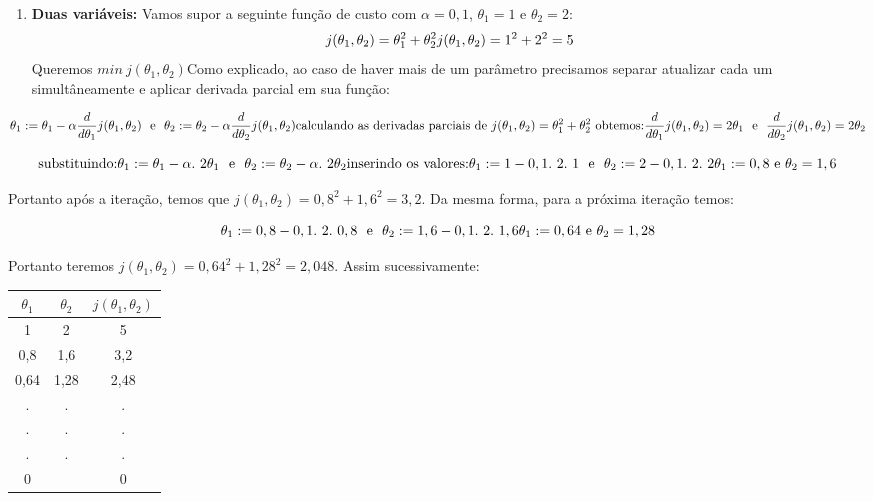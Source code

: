 \documentclass[
]{book}
\providecommand{\tightlist}{%
  \setlength{\itemsep}{0pt}\setlength{\parskip}{0pt}}
\begin{document}
\begin{enumerate}
\def\labelenumi{\arabic{enumi}.}
\setcounter{enumi}{1}
\tightlist
\item
  \textbf{Duas variáveis:} Vamos supor a seguinte função de custo com \(\alpha=0,1\), \(\theta_1=1\) e \(\theta_2=2\):
  \[j(\theta_1,\theta_2)=\theta_1^2+\theta_2^2 \\ 
  j(\theta_1,\theta_2)=1^2+2^2=5\]
  Queremos \(min \ j(\theta_1,\theta_2)\)Como explicado, ao caso de haver mais de um parâmetro precisamos separar atualizar cada um simultâneamente e aplicar derivada parcial em sua função:
\end{enumerate}

\[\theta_1:=\theta_1-\alpha \frac{d}{d\theta_1}j(\theta_1,\theta_2) \ \ \mbox{e}\ \ \theta_2:=\theta_2-\alpha \frac{d}{d\theta_2}j(\theta_1,\theta_2) \\
\mbox{calculando as derivadas parciais de}\ j(\theta_1,\theta_2)=\theta_1^2+\theta_2^2\ \mbox{obtemos:}\\
\frac{d}{d\theta_1}j(\theta_1,\theta_2)=2\theta_1 \ \
\mbox{e}\ \ \frac{d}{d\theta_2}j(\theta_1,\theta_2)=2\theta_2\]

\[\mbox{substituindo:} \\
\theta_1:=\theta_1-\alpha.\ 2\theta_1 \ \ \mbox{e}\ \ \theta_2:=\theta_2-\alpha .\ 2\theta_2 \\
\mbox{inserindo os valores:}\\
\theta_1:=1-0,1.\ 2.\ 1 \ \ \mbox{e}\ \ \theta_2:=2-0,1.\ 2.\ 2 \\
\theta_1:=0,8 \ \mbox{e} \ \theta_2=1,6\]

Portanto após a iteração, temos que \(j(\theta_1,\theta_2)=0,8^2+1,6^2=3,2\). Da mesma forma, para a próxima iteração temos:

\[\theta_1:=0,8-0,1.\ 2.\ 0,8 \ \ \mbox{e}\ \ \theta_2:=1,6-0,1.\ 2.\ 1,6 \\
\theta_1:=0,64 \ \mbox{e} \ \theta_2=1,28\]

Portanto teremos \(j(\theta_1,\theta_2)=0,64^2+1,28^2=2,048\). Assim sucessivamente:

\begin{longtable}[]{@{}ccc@{}}
\toprule
\textbf{\(\theta_1\)} & \textbf{\(\theta_2\)} & \textbf{\(j(\theta_1,\theta_2)\)}\tabularnewline
\midrule
\endhead
1 & 2 & 5\tabularnewline
0,8 & 1,6 & 3,2\tabularnewline
0,64 & 1,28 & 2,48\tabularnewline
. & . & .\tabularnewline
. & . & .\tabularnewline
. & . & .\tabularnewline
0 & & 0\tabularnewline
\bottomrule
\end{longtable}
\end{document}
